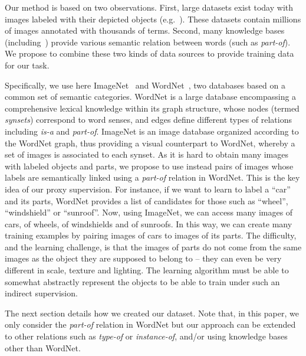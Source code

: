Our method is based on two observations.
%
First, large datasets exist today with images labeled with their depicted objects (e.g.~\cite{imagenet}).
%
These datasets contain millions of images annotated with thousands of
terms.
%
Second, many knowledge bases (including~\cite{wordnet, freebase, yago})
provide various semantic relation between words (such as \textit{part-of}).
%
We propose to combine these two kinds of data sources to provide
training data for our task.

Specifically, we use here ImageNet~\cite{imagenet} and
WordNet~\cite{wordnet}, two databases based on a common set of
semantic categories.
%
WordNet is a large database encompassing a comprehensive lexical
knowledge within its graph structure, whose nodes (termed {\it
  synsets}) correspond to word senses, and edges define different
types of relations including {\em is-a} and {\em part-of}.
%
ImageNet is an image database organized according to the WordNet graph,
thus providing a visual counterpart to WordNet,
whereby a set of images is associated to each synset.
As it is hard to obtain many images with labeled objects and parts, we
propose to use instead pairs of images whose labels are
semantically linked using a \textit{part-of} relation in WordNet.
%
This is the key idea of our proxy supervision.
%
For instance, if we want to learn to label a ``car'' and its parts,
WordNet provides a list of candidates for those such as ``wheel'',
``windshield'' or ``sunroof''.
%
Now, using ImageNet, we can access many images of cars, of wheels, of
windshields and of sunroofs. In this way, we can create many training examples
by pairing images of cars to images of its parts.
%
The difficulty, and the learning challenge, is that the images of
parts do not come from the same images as the object they are supposed
to belong to -- they can even be very different in scale, texture and
lighting. The learning algorithm must be able to somewhat abstractly
represent the objects to be able to train under such an indirect
supervision.

The next section details how we created our dataset. Note that, in
this paper, we only consider the \textit{part-of} relation in WordNet
but our approach can be extended to other relations such as
\textit{type-of} or \textit{instance-of}, and/or using knowledge bases other than WordNet.


